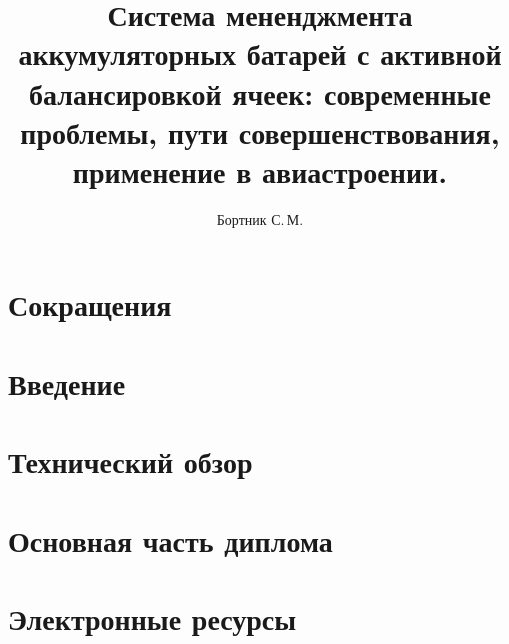 \documentclass{mipt-thesis-bs}
\title{Система мененджмента аккумуляторных батарей с активной балансировкой ячеек: современные проблемы, пути совершенствования, применение в авиастроении.}
\author{Бортник С.\,М.}
\begin{document}


\frontmatter
\titlecontents

\chapter{Сокращения}
\printacronyms[heading=none]

\mainmatter

\chapter{Введение}


\chapter{Технический обзор}


\chapter{Основная часть диплома}


\backmatter

\chapter{\bibname}
\printbibliography[heading=none]

\chapter{Электронные ресурсы}

\chapter{\appendixname}


\end{document}
